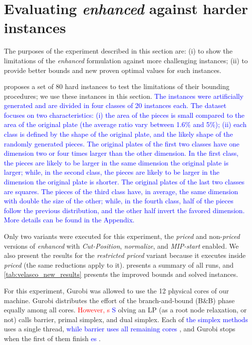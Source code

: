\documentclass[ppgc,tese,english,formais,babel]{iiufrgs}
\newif\iffinalversion
\newcommand{\newtext}[1]{\iffinalversion%
#1%
\else%
\textcolor{blue}{#1}%
\fi%
}
\newcommand{\oldtext}[1]{\iffinalversion%
\else%
\textcolor{red}{#1}%
\fi%
}
\begin{document}
\section{Evaluating \emph{enhanced} against harder instances}
\label{sec:new_results}

The purposes of the experiment described in this section are:
(i) to show the limitations of the \emph{enhanced} formulation against more challenging instances;
(ii) to provide better bounds and new proven optimal values for such instances.

\citet{velasco:2019} proposes a set of 80 hard instances to test the limitations of their bounding procedures; we use these instances in this section.
\newtext{The instances were artificially generated and are divided in four classes of 20 instances each. The dataset focuses on two characteristics: (i) the area of the pieces is small compared to the area of the original plate (the average ratio vary between 1.6\% and 5\%); (ii) each class is defined by the shape of the original plate, and the likely shape of the randomly generated pieces. The original plates of the first two classes have one dimension two or four times larger than the other dimension. In the first class, the pieces are likely to be larger in the same dimension the original plate is larger; while, in the second class, the pieces are likely to be larger in the dimension the original plate is shorter. The original plates of the last two classes are squares. The pieces of the third class have, in average, the same dimension with double the size of the other; while, in the fourth class, half of the pieces follow the previous distribution, and the other half invert the favored dimension. More details can be found in the Appendix.}

Only two variants were executed for this experiment, the \emph{priced} and non-\emph{priced} versions of \emph{enhanced} with \emph{Cut-Position}, \emph{normalize}, and \emph{MIP-start} enabled.
We also present the results for the \emph{restricted priced} variant because it executes inside \emph{priced} (the same reductions apply to it).
 presents a summary of all runs, and \cref{tab:velasco_new_results} presents the improved bounds and solved instances.

For this experiment, Gurobi was allowed to use the 12 physical cores of our machine.
Gurobi distributes the effort of the branch-and-bound (B\&B) phase equally among all cores.
\oldtext{However, s}\newtext{S}olving an LP (as a root node relaxation, or not) calls barrier, primal simplex, and dual simplex.
Each of \newtext{the simplex methods} uses a single thread, \newtext{while barrier uses all remaining cores}, and Gurobi stops when the first of them finish\newtext{es}.
\end{document}

